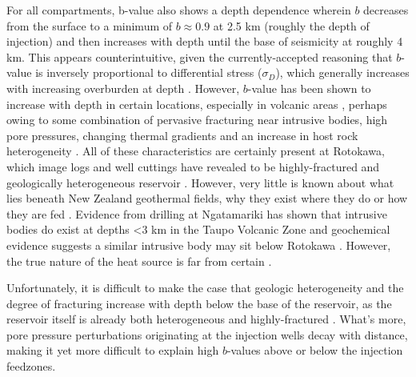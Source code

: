 For all compartments, b-value also shows a depth dependence wherein $b$ decreases from the surface to a minimum of $b\approx0.9$ at 2.5 km (roughly the depth of injection) and then increases with depth until the base of seismicity at roughly 4 km. This appears counterintuitive, given the currently-accepted reasoning that $b$-value is inversely proportional to differential stress ($\sigma_D$), which generally increases with increasing overburden at depth \citep{Schorlemmer_2005}. However, $b$-value has been shown to increase with depth in certain locations, especially in volcanic areas \citep[e.g.][]{Wiemer_1998}, perhaps owing to some combination of pervasive fracturing near intrusive bodies, high pore pressures, changing thermal gradients and an increase in host rock heterogeneity \citep{Schorlemmer_2005,Wiemer_1998,Warren_1970}. All of these characteristics are certainly present at Rotokawa, which image logs and well cuttings have revealed to be highly-fractured and geologically heterogeneous reservoir \cite{Massiot_2017,McNamara_2016}. However, very little is known about what lies beneath New Zealand geothermal fields, why they exist where they do or how they are fed \citep{Wilson_2016}. Evidence from drilling at Ngatamariki has shown that intrusive bodies do exist at depths \textless{3} km in the Taupo Volcanic Zone \citep{Chambefort_2016} and geochemical evidence suggests a similar intrusive body may sit below Rotokawa \citep{winick2009}. However, the true nature of the heat source is far from certain \citep{Wilson_2016}.

Unfortunately, it is difficult to make the case that geologic heterogeneity and the degree of fracturing increase with depth below the base of the reservoir, as the reservoir itself is already both heterogeneous and highly-fractured \citep{Massiot_2017,McNamara_2016}. What's more, pore pressure perturbations originating at the injection wells decay with distance, making it yet more difficult to explain high $b$-values above or below the injection feedzones.

